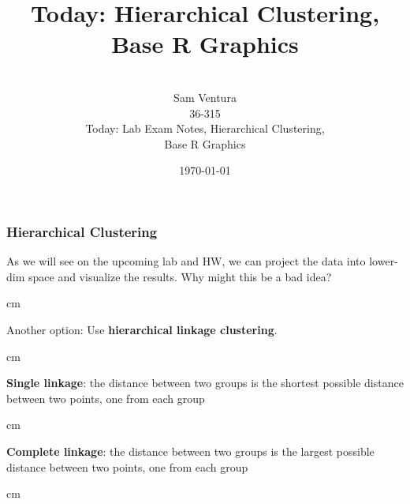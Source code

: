 \documentclass{beamer} %
\begin{document}
\title[dedup]{Today:  Hierarchical Clustering, Base R Graphics}


\author[Samuel L. Ventura]{\\
  \large{Sam Ventura\\36-315\\Today:  Lab Exam Notes, Hierarchical Clustering, \\Base R Graphics}}
\date{\today}


\begin{frame}
	\maketitle

	
\end{frame}



\begin{frame}\frametitle{Hierarchical Clustering}
	\small
	
	As we will see on the upcoming lab and HW, we can project the data into lower-dim space and visualize the results.  Why might this be a bad idea?
	
	 cm
	
	Another option:  Use \textbf{hierarchical linkage clustering}.
	
	 cm
	
	\textbf{Single linkage}:  the distance between two groups is the shortest possible distance between two points, one from each group
	
	 cm
	
	\textbf{Complete linkage}:  the distance between two groups is the largest possible distance between two points, one from each group
	
	 cm
	
\end{frame}
\end{document}
